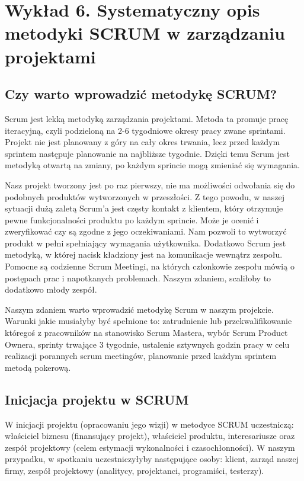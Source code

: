 \chapter{Wykład 6. Systematyczny opis metodyki SCRUM w zarządzaniu projektami}

\section{Czy warto wprowadzić metodykę SCRUM?}

Scrum jest lekką metodyką zarządzania projektami.  Metoda ta promuje pracę iteracyjną, czyli podzieloną na 2-6 tygodniowe okresy pracy zwane sprintami. Projekt nie jest planowany z góry na cały okres trwania, lecz przed każdym sprintem następuje planowanie na najbliższe tygodnie. Dzięki temu Scrum jest metodyką otwartą na zmiany, po każdym sprincie mogą zmieniać się wymagania. 

Nasz projekt tworzony jest po raz pierwszy, nie ma możliwości odwołania się do podobnych produktów wytworzonych w przeszłości. Z tego powodu, w naszej sytuacji dużą zaletą Scrum’a jest częsty kontakt z klientem, który otrzymuje pewne funkcjonalności produktu po każdym sprincie.  Może je ocenić i zweryfikować czy są zgodne z jego oczekiwaniami. Nam pozwoli to wytworzyć produkt w pełni spełniający wymagania użytkownika. Dodatkowo Scrum jest metodyką, w której nacisk kładziony jest na komunikacje wewnątrz zespołu. Pomocne są codzienne Scrum Meetingi, na których członkowie zespołu mówią o postępach prac i napotkanych problemach. Naszym zdaniem, scaliłoby to dodatkowo młody zespół. 

Naszym zdaniem warto wprowadzić metodykę Scrum w naszym projekcie. Warunki jakie musiałyby być spełnione to: zatrudnienie lub przekwalifikowanie któregoś z pracowników na stanowisko Scrum Mastera,  wybór Scrum Product Ownera, sprinty trwające 3 tygodnie, ustalenie sztywnych godzin pracy w celu realizacji porannych scrum meetingów, planowanie przed każdym sprintem metodą pokerową.

\clearpage

\section{Inicjacja projektu w SCRUM}

W inicjacji projektu (opracowaniu jego wizji) w metodyce SCRUM uczestniczą: właściciel biznesu (finansujący projekt), właściciel produktu, interesariusze oraz zespół projektowy (celem estymacji wykonalności i czasochłonności). W naszym przypadku, w spotkaniu uczestniczyłyby następujące osoby: klient, zarząd naszej firmy, zespół projektowy (analitycy, projektanci, programiści, testerzy).

